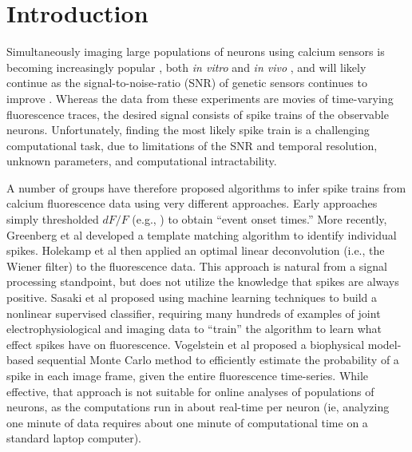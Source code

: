 \section{Introduction}


Simultaneously imaging large populations of neurons using calcium sensors is becoming increasingly popular \cite{ImagingManual}, both \emph{in vitro} \cite{SmettersYuste99, IkegayaYuste04} and \emph{in vivo} \cite{NagayamaChen07, GobelHelmchen07, LuoSvoboda08}, and will likely continue as the signal-to-noise-ratio (SNR) of genetic sensors continues to improve \cite{GaraschukKonnerth07, MankGriesbeck08b, WallaceHasan08}.  Whereas the data from these experiments are movies of time-varying fluorescence traces, the desired signal consists of spike trains of the observable neurons. Unfortunately, finding the most likely spike train is a challenging computational task, due to limitations of the SNR and temporal resolution, unknown parameters, and computational intractability. %

A number of groups have therefore proposed algorithms to infer spike trains from calcium fluorescence data using very different approaches.  Early approaches simply thresholded $dF/F$ (e.g., \cite{Schwartz98,Mao01}) to obtain ``event onset times.''  More recently, Greenberg et al \cite{GreenbergKerr08} developed a  template matching algorithm to identify individual spikes. %
Holekamp et al \cite{HolekampHoly08} then applied an optimal linear deconvolution (i.e., the Wiener filter) to the fluorescence data.  This approach is natural from a signal processing standpoint, but does not utilize the knowledge that spikes are always positive.  Sasaki et al \cite{SasakiIkegaya08} proposed using machine learning techniques to build a nonlinear supervised classifier, requiring many hundreds of examples of joint electrophysiological and imaging data to ``train'' the algorithm to learn what effect spikes have on fluorescence.  Vogelstein et al \cite{VogelsteinPaninski09} proposed a biophysical model-based sequential Monte Carlo method to efficiently estimate the probability of a spike in each image frame, given the entire fluorescence time-series.  While effective, that approach is not suitable for online analyses of populations of neurons, as the computations run in about real-time per neuron (ie, analyzing one minute of data requires about one minute of computational time on a standard laptop computer).

